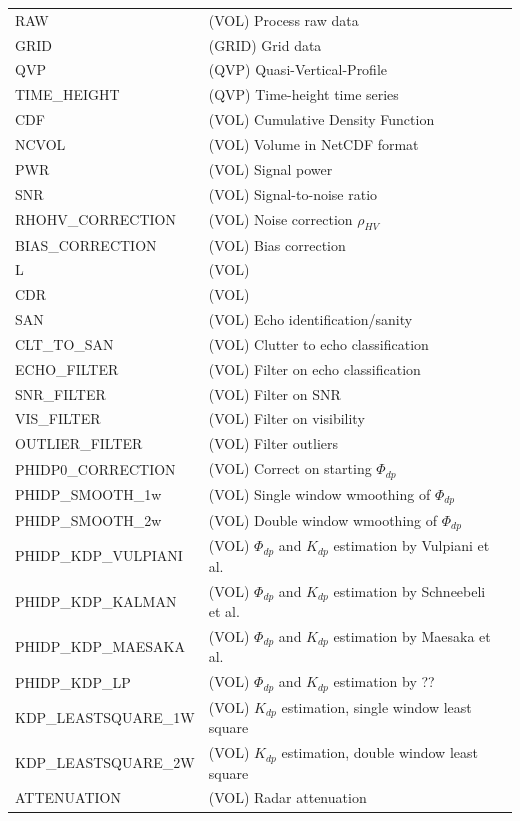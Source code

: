 \documentclass[a4paper,11pt,pdftex,twoside]{scrartcl}
\begin{document}
{{{\begin{longtable}{p{}p{}p{}}
RAW & (VOL) Process raw data &  \\
GRID & (GRID) Grid data & \\
QVP & (QVP) Quasi-Vertical-Profile & \\
TIME\_HEIGHT & (QVP) Time-height time series & \\
CDF & (VOL)  Cumulative Density Function & \\
NCVOL & (VOL) Volume in NetCDF format & \\
PWR & (VOL) Signal power & \\
SNR & (VOL) Signal-to-noise ratio & \\
RHOHV\_CORRECTION & (VOL) Noise correction $\rho_{HV}$ & \\
BIAS\_CORRECTION & (VOL) Bias correction & \\
L & (VOL) &  \\
CDR & (VOL) & \\
SAN & (VOL) Echo identification/sanity & \\
CLT\_TO\_SAN & (VOL) Clutter to echo classification & \\
ECHO\_FILTER & (VOL)   Filter on echo classification & \\
SNR\_FILTER & (VOL) Filter on SNR & \\
VIS\_FILTER & (VOL) Filter on visibility & \\
OUTLIER\_FILTER & (VOL) Filter outliers & \\
PHIDP0\_CORRECTION & (VOL) Correct on starting $\Phi_{dp}$ & \\
PHIDP\_SMOOTH\_1w & (VOL) Single window wmoothing of $\Phi_{dp}$ & \\
PHIDP\_SMOOTH\_2w & (VOL) Double window wmoothing of $\Phi_{dp}$ & \\
PHIDP\_KDP\_VULPIANI & (VOL) $\Phi_{dp}$ and $K_{dp}$ estimation by Vulpiani et al. & \\
PHIDP\_KDP\_KALMAN & (VOL) $\Phi_{dp}$ and $K_{dp}$ estimation by Schneebeli et al. & \\
PHIDP\_KDP\_MAESAKA & (VOL) $\Phi_{dp}$ and $K_{dp}$ estimation by Maesaka et al. & \\
PHIDP\_KDP\_LP & (VOL) $\Phi_{dp}$ and $K_{dp}$ estimation by ?? & \\
KDP\_LEASTSQUARE\_1W & (VOL) $K_{dp}$ estimation, single window least square & \\
KDP\_LEASTSQUARE\_2W & (VOL) $K_{dp}$ estimation, double window least square & \\
ATTENUATION & (VOL) Radar attenuation & \\

\end{longtable}}}}
\end{document}
